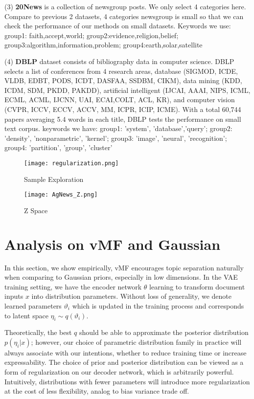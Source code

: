 \documentclass[11pt]{article}
\begin{document}
(3) \textbf{20News} \cite{lang1995newsweeder} is a collection of newsgroup posts. We only select 4 categories here. Compare to previous 2 datasets, 4 categories newsgroup is small so that we can check the performance of our methods on small datasets. Keywords we use: group1: faith,accept,world;
group2:evidence,religion,belief;
group3:algorithm,information,problem;
group4:earth,solar,satellite

(4) \textbf{DBLP} \cite{DBLP:conf/ijcai/PanWZZW16} dataset consists of bibliography data in computer science. DBLP selects a list of conferences from 4 research areas, database (SIGMOD, ICDE, VLDB, EDBT, PODS, ICDT, DASFAA, SSDBM, CIKM), data mining (KDD, ICDM, SDM, PKDD, PAKDD), artificial intelligent (IJCAI, AAAI, NIPS, ICML, ECML, ACML, IJCNN, UAI, ECAI,COLT, ACL, KR), and computer vision (CVPR, ICCV, ECCV, ACCV, MM, ICPR, ICIP, ICME). With a total 60,744 papers averaging 5.4 words in each title, DBLP tests the performance on small text corpus. keywords we have: group1: 'system', 'database','query'; group2: 'density', 'nonparametric', 'kernel';
group3: 'image', 'neural', 'recognition'; group4: 'partition', 'group', 'cluster'
\begin{figure*}[h]
\centering
\texttt{[image: regularization.png]}

\caption{Sample Exploration}
\label{fig:22}
\end{figure*}

\begin{figure*}[h]
\centering
\texttt{[image: AgNews\_Z.png]}

\caption{Z Space}
\label{fig:people2}
\end{figure*}

\section{Analysis on vMF and Gaussian}
\label{appendix:appendix2}
In this section, we show empirically, vMF encourages topic separation naturally when comparing to Gaussian priors, especially in low dimensions. In the VAE training setting, we have the encoder network $\theta$ learning to transform document inputs $x$ into distribution parameters. Without loss of generality, we denote learned parameters $\vartheta_{i}$ which is updated in the training process and corresponds to latent space $\eta_{i} \sim q(\vartheta_{i})$.

Theoretically, the best $q$ should be able to approximate the posterior distribution $p(\eta_{i}|x)$; however, our choice of parametric distribution family in practice will always associate with our intentions, whether to reduce training time or increase expressability. The choice of prior and posterior distribution can be viewed as a form of regularization on our decoder network, which is arbitrarily powerful. Intuitively, distributions with fewer parameters will introduce more regularization at the cost of less flexibility, analog to bias variance trade off.
\end{document}
